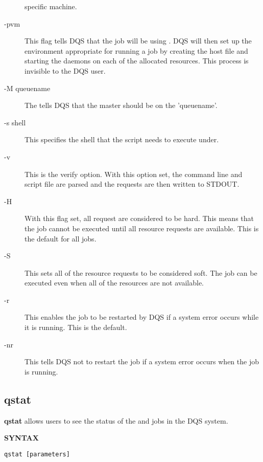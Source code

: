 \begin{description}
specific machine.
\item[-pvm] This flag tells DQS that the job will be using \pvm.  DQS will
then set up the environment appropriate for running a \pvm job by
creating the \pvm host file and starting the \pvm daemons on each of the
allocated resources.  This process is invisible to the DQS user.
\item[-M queuename] The tells DQS that the \pvm master should be on the
\queue 'queuename'.
\item[-s shell] This specifies the shell that the script needs to execute
under.
\item[-v] This is the verify option.  With this option set, the command
line and script file are parsed and the requests are then written to
STDOUT.
\item[-H] With this flag set, all request are considered to be hard.  This
means that the job cannot be executed until all resource requests are
available.  This is the default for all jobs.
\item[-S] This sets all of the resource requests to be considered soft.
The job can be executed even when all of the resources are not
available.
\item[-r] This enables the job to be restarted by DQS if a system error
occurs while it is running.  This is the default.
\item[-nr] This tells DQS not to restart the job if a system error occurs
when
the job is running.
\end{description}

\subsection{qstat}

{\bf qstat} allows users to see the status of the \queues and jobs in the
DQS system.

{\bf SYNTAX}
\begin{verbatim}
qstat [parameters]
\end{verbatim}

